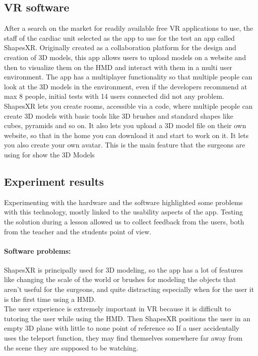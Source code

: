 \subsection{VR software}
\noindent
After a search on the market for readily available free \ac{VR} applications to use, the staff of the cardiac unit selected as the app to use for the test an app called ShapesXR.
Originally created as a collaboration platform for the design and creation of 3D models, this app allows users to upload models on a website and then to visualize them on the HMD and interact with them in a multi user environment.
The app has a multiplayer functionality so that multiple people can look at the 3D models in the environment, even if the developers recommend at max 8 people, initial tests with 14 users connected did not any problem.\\
ShapesXR lets you create rooms, accessible via a code, where multiple people can create 3D models with basic tools like 3D brushes and standard shapes like cubes, pyramids and so on.
It also lets you upload a 3D model file on their own website, so that in the home you can download it and start to work on it.
It lets you also create your own avatar.
This is the main feature that the surgeons are using for show the 3D Models

\subsection{Experiment results}
\noindent
Experimenting with the hardware and the software highlighted some problems with this technology, mostly linked to the usability aspects of the app. Testing the solution during a lesson allowed us to collect feedback from the users, both from the teacher and the students point of view.

\paragraph{Software problems:}
ShapesXR is principally used for 3D modeling, so the app has a lot of features like changing the scale of the world or brushes for modeling the objects that aren't useful for the surgeons,
and quite distracting especially when for the user it is the first time using a \ac{HMD}.\\
The user experience is extremely important in \ac{VR} because it is difficult to tutoring the user while using the \ac{HMD}.
Then ShapesXR positions the user in an empty 3D plane with little to none point of reference so If a user accidentally uses the teleport function, they may find themselves somewhere far away from the scene they are supposed to be watching.

